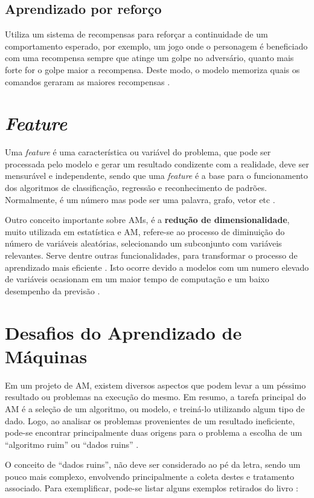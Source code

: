\subsection{Aprendizado por reforço}
Utiliza um sistema de recompensas para reforçar a continuidade de um comportamento esperado, por exemplo, um jogo onde o personagem é beneficiado com uma recompensa sempre que atinge um golpe no adversário, quanto mais forte for o golpe maior a recompensa. Deste modo, o modelo memoriza quais os comandos geraram as maiores recompensas \cite{kirk2014thoughtful}.

\section{\textit{Feature}} 
Uma \textit{feature} é uma característica ou variável do problema, que pode ser processada pelo modelo e gerar um resultado condizente com a realidade, deve ser mensurável e independente, sendo que uma \textit{feature} é a base para o funcionamento dos algoritmos de classificação, regressão e reconhecimento de padrões. Normalmente, é um número mas pode ser uma palavra, grafo, vetor etc \cite{chandrashekar2014survey}.

Outro conceito importante sobre AMs, é a \textbf{redução de dimensionalidade}, muito utilizada em estatística e AM, refere-se ao processo de diminuição do número de variáveis aleatórias, selecionando um subconjunto com variáveis relevantes. Serve dentre outras funcionalidades, para transformar o processo de aprendizado mais eficiente \cite{borges2006reduccao}. Isto ocorre devido a modelos com um numero elevado de variáveis ocasionam em um maior tempo de computação e um baixo desempenho da previsão \cite{chandrashekar2014survey}.

\section{Desafios do Aprendizado de Máquinas}
Em um projeto de AM, existem diversos aspectos que podem levar a um péssimo resultado ou problemas na execução do mesmo. Em resumo, a tarefa principal do AM é a seleção de um algoritmo, ou modelo, e treiná-lo utilizando algum tipo de dado. Logo, ao analisar os problemas provenientes de um resultado ineficiente, pode-se encontrar principalmente duas origens para o problema a escolha de um “algoritmo ruim” ou “dados ruins” \cite{geron2017hands}.

O conceito de “dados ruins”, não deve ser considerado ao pé da letra, sendo um pouco mais complexo, envolvendo principalmente a coleta destes e tratamento associado. Para exemplificar,  pode-se listar alguns exemplos retirados do livro \cite{geron2017hands}:

